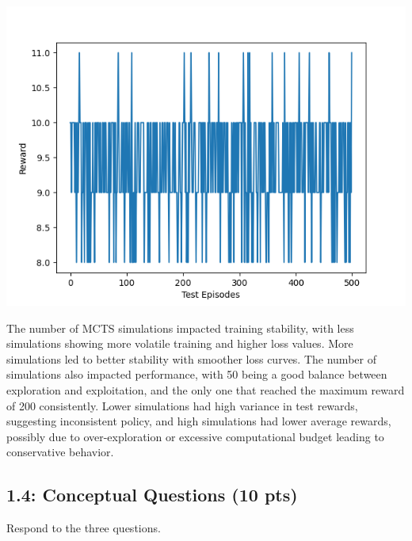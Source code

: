\documentclass[12pt]{article}
\begin{document}
\begin{tcolorbox}[height=45em, width=\textwidth]
\begin{center}
\begin{minipage}{0.32\textwidth}
            \includegraphics[width=\textwidth]{outputs/plots/sim_100/testing/test_rewards.png}
        \end{minipage}    
    \end{center}

    The number of MCTS simulations impacted training stability, with less simulations showing more volatile training and higher loss values. More simulations led to better stability with smoother loss curves. The number of simulations also impacted performance, with 50 being a good balance between exploration and exploitation, and the only one that reached the maximum reward of 200 consistently. Lower simulations had high variance in test rewards, suggesting inconsistent policy, and high simulations had lower average rewards, possibly due to over-exploration or excessive computational budget leading to conservative behavior.
\end{tcolorbox}
\newpage


\subsection*{1.4: Conceptual Questions (10 pts)}
Respond to the three questions.
\end{document}

